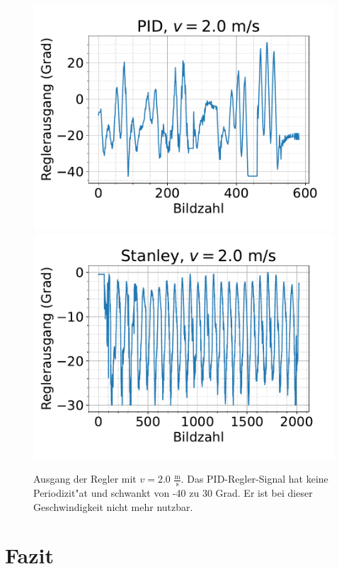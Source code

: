 \documentclass[arbeit=studie,oneside,BCOR=12mm]{ArbeitRST}
\begin{document}
\begin{figure}[h]
    \centering
    \includegraphics[scale=0.47]{pid2.0}
    \includegraphics[scale=0.47]{Stan2.0}
    \caption{Ausgang der Regler mit $v = 2.0$ $\frac{\mathrm{m}}{\mathrm{s}}$.
    Das PID-Regler-Signal hat keine Periodizit"at und schwankt von -40 zu 30
    Grad. Er ist bei dieser Geschwindigkeit nicht mehr nutzbar.}
    \label{reg:2.0}
\end{figure}




\chapter{Fazit}
\end{document}
